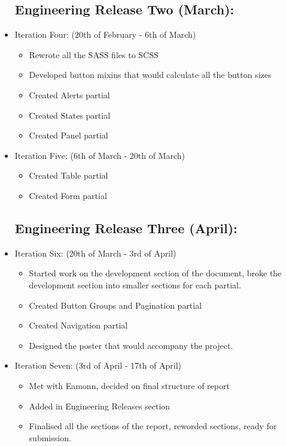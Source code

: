 \begin{itemize}
	\subsection*{Engineering Release Two (March):}
	\item Iteration Four: (20th of February - 6th of March)\begin{itemize} 
	\item Rewrote all the \gls{SASS} files to \gls{SCSS}
	\item Developed button mixins that would calculate all the button sizes
	\item Created Alerts partial
	\item Created States partial
	\item Created Panel partial
	\end{itemize}
	\item Iteration Five: (6th of March - 20th of March) \begin{itemize}
	\item Created Table partial
	\item Created Form partial
	\end{itemize}
	\subsection*{Engineering Release Three (April):}
	\item Iteration Six: (20th of March - 3rd of April)\begin{itemize}
	\item Started work on the development section of the document, broke the development section into smaller sections for each partial. 
	\item Created Button Groups and Pagination partial
	\item Created Navigation partial
	\item Designed the poster that would accompany the project.
	\end{itemize}
		\item Iteration Seven: (3rd of April - 17th of April)\begin{itemize}
	\item Met with Eamonn, decided on final structure of report
	\item Added in Engineering Releases section
	\item Finalised all the sections of the report, reworded sections, ready for submission.
	\end{itemize}	
\end{itemize}